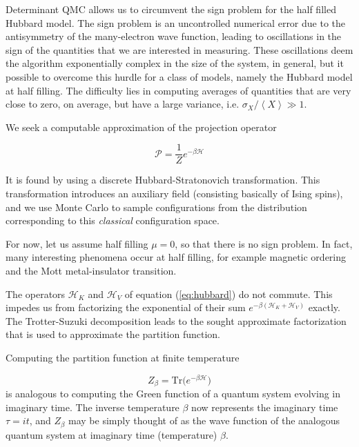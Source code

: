\documentclass[10pt, twocolumn, twoside]{article}
\begin{document}
Determinant QMC allows us to circumvent the sign problem for the half filled Hubbard model. The sign problem is an uncontrolled numerical error due to the antisymmetry of the many-electron wave function, leading to oscillations in the sign of the quantities that we are interested in measuring. These oscillations deem the algorithm exponentially complex in the size of the system, in general, but it possible to overcome this hurdle for a class of models, namely the Hubbard model at half filling. The difficulty lies in computing averages of quantities that are very close to zero, on average, but have a large variance, i.e. $\sigma_X / \left\langle X \right\rangle \gg 1$.

We seek a computable approximation of the projection operator 

\begin{equation}
\mathcal{P} = \frac{1}{Z} e^{-\beta\mathcal{H} }
\end{equation} 

It is found by using a discrete Hubbard-Stratonovich transformation. This transformation introduces an auxiliary field (consisting basically of Ising spins), and we use Monte Carlo to sample configurations from the distribution corresponding to this \emph{classical} configuration space.

For now, let us assume half filling $\mu = 0$, so that there is no sign problem. In fact, many interesting phenomena occur at half filling, for example magnetic ordering and the Mott metal-insulator transition.

The operators $\mathcal{H}_K$ and $\mathcal{H}_V$ of equation (\ref{eq:hubbard}) do not commute. This impedes us from factorizing the exponential of their sum $e^{-\beta (\mathcal{H}_K + \mathcal{H}_V)}$ exactly. The Trotter-Suzuki decomposition leads to the sought approximate factorization that is used to approximate the partition function.

Computing the partition function at finite temperature

\begin{equation}
Z_\beta = \text{Tr} \big( e^{-\beta \mathcal{H} } \big)
\end{equation}
is analogous to computing the Green function of a quantum system evolving in imaginary time. The inverse temperature $\beta$ now represents the imaginary time $\tau = it$, and $Z_\beta$ may be simply thought of as the wave function of the analogous quantum system at imaginary time (temperature) $\beta$.
 
\end{document}
